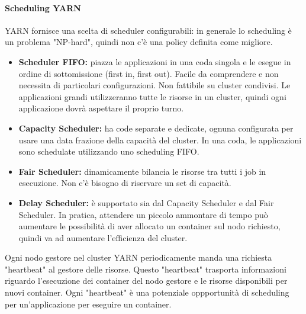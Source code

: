 \documentclass{article}
\begin{document}
\begin{appendices}
\paragraph{Scheduling YARN} 
YARN fornisce una scelta di scheduler configurabili: in generale lo scheduling è un problema "NP-hard", quindi non c'è una policy definita come migliore.
\begin{itemize}
    \item \textbf{Scheduler FIFO:} piazza le applicazioni in una coda singola e le esegue in ordine di sottomissione (first in, first out). Facile da comprendere e non necessita di particolari configurazioni. Non fattibile su cluster condivisi. Le applicazioni grandi utilizzeranno tutte le risorse in un cluster, quindi ogni applicazione dovrà aspettare il proprio turno.
    \item \textbf{Capacity Scheduler:} ha code separate e dedicate, ognuna configurata per usare una data frazione della capacità del cluster. In una coda, le applicazioni sono schedulate utilizzando uno scheduling FIFO.
    \item \textbf{Fair Scheduler:} dinamicamente bilancia le risorse tra tutti i job in esecuzione. Non c'è bisogno di riservare un set di capacità.
    \item \textbf{Delay Scheduler:} è supportato sia dal Capacity Scheduler e dal Fair Scheduler. In pratica, attendere un piccolo ammontare di tempo può aumentare le possibilità di aver allocato un container sul nodo richiesto, quindi va ad aumentare l'efficienza del cluster.
\end{itemize}
Ogni nodo gestore nel cluster YARN periodicamente manda una richiesta "heartbeat" al gestore delle risorse. Questo "heartbeat" trasporta informazioni riguardo l'esecuzione dei container del nodo gestore e le risorse disponibili per nuovi container. Ogni "heartbeat" è una potenziale oppportunità di scheduling per un'applicazione per eseguire un container.


\end{appendices}
\end{document}

